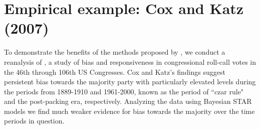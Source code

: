 % 


\chapter{Empirical example: Cox and Katz (2007)}
\label{cox_katz}

To demonstrate the benefits of the methods proposed by , we conduct a reanalysis of , a study of bias and responsiveness in congressional roll-call votes in the 46th through 106th US Congresses. Cox and Katz's findings suggest persistent bias towards the majority party with particularly elevated levels during the periods from 1889-1910 and 1961-2000, known as the period of ``czar rule" and the post-packing era, respectively. Analyzing the data using Bayesian STAR models we find much weaker evidence for bias towards the majority over the time periods in question. 

